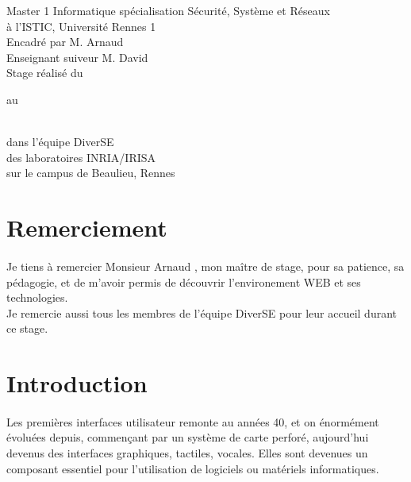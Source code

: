 \documentclass[11pt, a4paper, pdftex]{article}
\begin{document}
    \maketitle
    \thispagestyle{pagedegarde}
    \begin{center}
        \vspace{0.25cm} Master 1 Informatique spécialisation Sécurité, Système et Réseaux \\ à l'ISTIC, Université Rennes 1 \\
        \vspace{0.25cm} Encadré par M. Arnaud  \\
        \vspace{0.25cm} Enseignant suiveur M. David  \\
        \vspace{0.25cm} Stage réalisé du \date{15 mai 2018} au \date{31 août 2018} \\ \vspace{0.25cm} dans l'équipe DiverSE \\ des laboratoires INRIA/IRISA \\ sur le campus de Beaulieu, Rennes
    \end{center}


    \newpage
    \clearpage
    \setcounter{page}{1}
    \pagestyle{document}
    \section*{Remerciement}\label{sec:remerciement}
    \paragraph{}
    Je tiens à remercier Monsieur Arnaud , mon maître de stage, pour sa patience, sa pédagogie, et de m'avoir permis de découvrir l'environement WEB et ses technologies. \\
    Je remercie aussi tous les membres de l'équipe DiverSE pour leur accueil durant ce stage.
    \newpage

    \tableofcontents

    \newpage

    \section{Introduction}\label{sec:introduction}
        \paragraph{}
            Les premières interfaces utilisateur remonte au années 40, et on énormément évoluées depuis, commençant par un système de carte perforé, aujourd'hui devenus des interfaces graphiques, tactiles, vocales.
            Elles sont devenues un composant essentiel pour l'utilisation de logiciels ou matériels informatiques. %
\end{document}
